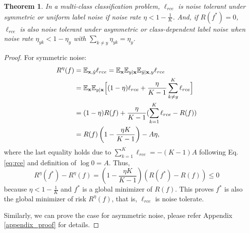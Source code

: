 \documentclass[10pt,twocolumn,letterpaper]{article}
\newtheorem{theorem}{Theorem}
\newcommand{\E}{\mathbb{E}}
\def \xx {\mathbf{x}}
\begin{document}
\begin{theorem}\label{theorem_1}
In a multi-class classification problem, $\ell_{rce}$ is noise tolerant under symmetric or uniform label noise if noise rate $\eta < 1 -\frac{1}{K}$. And, if $R(f^*) = 0$, $\ell_{rce}$ is also noise tolerant under asymmetric or class-dependent label noise when noise rate $\eta_{y k} < 1-\eta_{y}$ with $\sum_{k \neq y}\eta_{y k}=\eta_{y}$.
\end{theorem}
\begin{proof}
For symmetric noise:
\begin{align*}
	\small
	R^\eta(f) & =  \E_{\xx, \hat{y}} \ell_{rce} =  \E_{\xx} \E_{y | \xx} \E_{\hat{y} | \xx, y} \ell_{rce} \\
		&= \E_{\xx} \E_{y | \xx} \Big[ (1-\eta) \ell_{rce} + \frac{\eta}{K-1} \sum_{k\neq y}^{K} \ell_{rce} \Big] \\
		& =  (1 - \eta) R(f) +  \frac{\eta}{K-1} (\sum_{k=1}^{K}\ell_{rce} - R(f))\\
		& = R(f)\left(1-\frac{\eta K}{K-1}\right) - A \eta,
\end{align*}
where the last equality holds due to $\sum_{k=1}^{K}\ell_{rce} = - (K-1)A$ following Eq. \eqref{eq:rce} and definition of $\log 0 = A$. Thus, 
	\[R^\eta(f^*)-R^\eta(f)=(1-\frac{\eta K}{K-1})(R(f^*)-R(f)) \leq 0\]
because $\eta < 1 - \frac{1}{K}$ and $f^*$ is a global minimizer of $R(f)$. This proves $f^*$ is also the global minimizer of risk $R^\eta(f)$, that is, $\ell_{rce}$ is noise tolerate. 
	
Similarly, we can prove the case for asymmetric noise, please refer Appendix \ref{appendix_proof} for details.
\end{proof}
\end{document}
